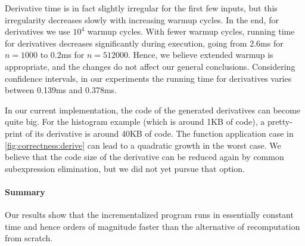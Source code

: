 Derivative time is in fact slightly irregular for the first few inputs,
but this irregularity decreases slowly with increasing warmup
cycles. In the end, for derivatives we use $10^4$ warmup cycles.
With fewer warmup cycles, running time for derivatives decreases
significantly during execution, going from 2.6ms for $n = 1000$ to
0.2ms for $n = 512000$. Hence, we believe extended warmup is
appropriate, and the changes do not affect our general
conclusions. Considering confidence intervals, in our experiments the running
time for derivatives varies between 0.139ms and 0.378ms.

In our current implementation, the code of the generated derivatives can become 
quite big. For the histogram example (which is around 1KB of code), a pretty-print
of its derivative is around 40KB of code. The function application case
in \cref{fig:correctness:derive} can lead to a quadratic growth in the 
worst case. We believe that the code size of the derivative can be reduced again 
by common subexpression elimination, but we did not yet pursue that option.

\paragraph{Summary}
Our results show that the incrementalized program runs
in essentially constant time and hence orders of magnitude faster than
the alternative of recomputation from scratch. 
